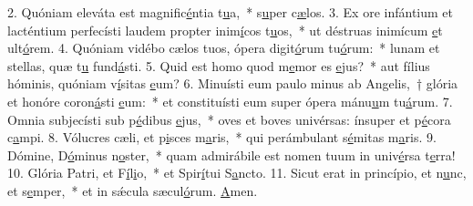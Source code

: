 2. Quóniam eleváta est magnific\uline{é}ntia t\uline{u}a,~* s\uline{u}per c\uline{æ}los.
3. Ex ore infántium et lacténtium perfecísti laudem propter inim\uline{í}cos t\uline{u}os,~* ut déstruas inimícum \uline{e}t ult\uline{ó}rem.
4. Quóniam vidébo cælos tuos, ópera digit\uline{ó}rum tu\uline{ó}rum:~* lunam et stellas, quæ t\uline{u} fund\uline{á}sti.
5. Quid est homo quod m\uline{e}mor es \uline{e}jus?~* aut fílius hóminis, quóniam v\uline{í}sitas \uline{e}um?
6. Minuísti eum paulo minus ab Angelis,~† glória et honóre coron\uline{á}sti \uline{e}um:~* et constituísti eum super ópera mánu\uline{u}m tu\uline{á}rum.
7. Omnia subjecísti sub p\uline{é}dibus \uline{e}jus,~* oves et boves univérsas: ínsuper et p\uline{é}cora c\uline{a}mpi.
8. Vólucres cæli, et p\uline{i}sces m\uline{a}ris,~* qui perámbulant s\uline{é}mitas m\uline{a}ris.
9. Dómine, D\uline{ó}minus n\uline{o}ster,~* quam admirábile est nomen tuum in univ\uline{é}rsa t\uline{e}rra!
10. Glória Patri, et F\uline{í}l\uline{i}o,~* et Spir\uline{í}tui S\uline{a}ncto.
11. Sicut erat in princípio, et n\uline{u}nc, et s\uline{e}mper,~* et in sǽcula sæcul\uline{ó}rum. \uline{A}men.
